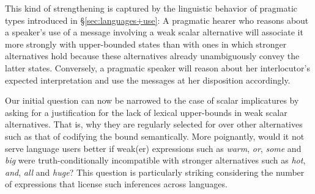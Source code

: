 \documentclass[a4paper]{article}
\begin{document}
This kind of strengthening is captured by the linguistic behavior of pragmatic types introduced in \S\ref{sec:languages+use}: A pragmatic hearer who reasons about a speaker's use of a message involving a weak scalar alternative will associate it more strongly with upper-bounded states than with ones in which stronger alternatives hold because these alternatives already unambiguously convey the latter states. Conversely, a pragmatic speaker will reason about her interlocutor's expected interpretation and use the messages at her disposition accordingly. 

Our initial question can now be narrowed to the case of scalar implicatures by asking for a justification for the lack of lexical upper-bounds in weak scalar alternatives. That is, why they are regularly selected for over other alternatives such as that of codifying the bound semantically. More poignantly, would it not serve language users better if weak(er) expressions such as {\em warm}, {\em or}, {\em some} and {\em big} were truth-conditionally incompatible with stronger alternatives such as {\em hot}, {\em and}, {\em all} and {\em huge}?  This question is particularly striking considering the number of expressions that license such inferences across languages. 
\end{document}
